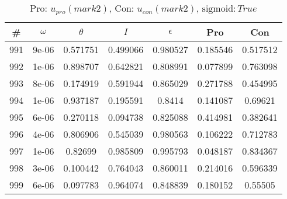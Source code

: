 \newpage
\begin{table}
\caption{Pro: $u_{pro} (mark 2)$, Con: $u_{con} (mark 2)$, $\mathrm{sigmoid}: True$}
\begin{tabular*}{\linewidth}{c|c|c|c|c|c|c}
\# & $\omega$ & $\theta$ & $I$ & $\epsilon$ & Pro & Con \\
\hline
991 & 9e-06 & 0.571751 & 0.499066 & 0.980527 & 0.185546 & 0.517512\\
992 & 1e-06 & 0.898707 & 0.642821 & 0.808991 & 0.077899 & 0.763098\\
993 & 8e-06 & 0.174919 & 0.591944 & 0.865029 & 0.271788 & 0.454995\\
994 & 1e-06 & 0.937187 & 0.195591 & 0.8414 & 0.141087 & 0.69621\\
995 & 6e-06 & 0.270118 & 0.094738 & 0.825088 & 0.414981 & 0.382641\\
996 & 4e-06 & 0.806906 & 0.545039 & 0.980563 & 0.106222 & 0.712783\\
997 & 1e-06 & 0.82699 & 0.985809 & 0.995793 & 0.048187 & 0.834367\\
998 & 3e-06 & 0.100442 & 0.764043 & 0.860011 & 0.214016 & 0.596339\\
999 & 6e-06 & 0.097783 & 0.964074 & 0.848839 & 0.180152 & 0.55505\\
\end{tabular*}
\end{table}